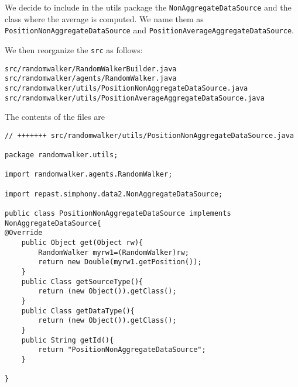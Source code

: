\documentclass{article}
\begin{document}
We decide to include in the utils package the \verb+NonAggregateDataSource+ and the class where the average is computed. We name them as 
\verb+PositionNonAggregateDataSource+ and \verb+PositionAverageAggregateDataSource+.

We then reorganize the \verb+src+ as follows:
\begin{verbatim}
src/randomwalker/RandomWalkerBuilder.java
src/randomwalker/agents/RandomWalker.java
src/randomwalker/utils/PositionNonAggregateDataSource.java
src/randomwalker/utils/PositionAverageAggregateDataSource.java
\end{verbatim}


The contents of the files are 

\begin{verbatim}
// +++++++ src/randomwalker/utils/PositionNonAggregateDataSource.java

package randomwalker.utils;

import randomwalker.agents.RandomWalker;

import repast.simphony.data2.NonAggregateDataSource;

public class PositionNonAggregateDataSource implements NonAggregateDataSource{
@Override
	public Object get(Object rw){
		RandomWalker myrw1=(RandomWalker)rw;
		return new Double(myrw1.getPosition());
	}
	public Class getSourceType(){
		return (new Object()).getClass();
	}
	public Class getDataType(){
		return (new Object()).getClass();
	}
	public String getId(){
		return "PositionNonAggregateDataSource";
	}

}
\end{verbatim}
\end{document}
